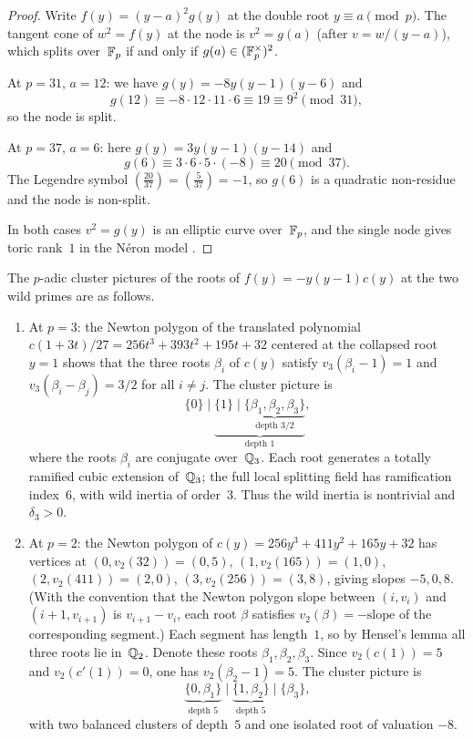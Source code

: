 \begin{proof}
Write \(f(y)=(y-a)^2g(y)\) at the double root \(y\equiv a\pmod{p}\). The tangent cone of \(w^2=f(y)\) at the node is \(v^2=g(a)\) (after \(v=w/(y-a)\)), which splits over~\(\mathbb{F}_p\) if and only if \(g(a)\in(\mathbb{F}_p^\times)^2\).

At \(p=31\), \(a=12\): we have \(g(y)=-8y(y-1)(y-6)\) and
\[
g(12)\equiv -8\cdot 12\cdot 11\cdot 6\equiv 19\equiv 9^2\pmod{31},
\]
so the node is split.

At \(p=37\), \(a=6\): here \(g(y)=3y(y-1)(y-14)\) and
\[
g(6)\equiv 3\cdot 6\cdot 5\cdot(-8)\equiv 20\pmod{37}.
\]
The Legendre symbol \(\left(\frac{20}{37}\right)=\left(\frac{5}{37}\right)=-1\), so \(g(6)\) is a quadratic non-residue and the node is non-split.

In both cases \(v^2=g(y)\) is an elliptic curve over~\(\mathbb{F}_p\), and the single node gives toric rank~\(1\) in the N\'eron model \cite{Liu2002}.
\end{proof}

\begin{proposition}\label{prop:cluster-pictures}
The \(p\)-adic cluster pictures of the roots of \(f(y)=-y(y-1)c(y)\) at the two wild primes are as follows.
\begin{enumerate}
\item[(i)] At \(p=3\): the Newton polygon of the translated polynomial \(c(1+3t)/27=256t^3+393t^2+195t+32\) centered at the collapsed root \(y=1\) shows that the three roots \(\beta_i\) of \(c(y)\) satisfy \(v_3(\beta_i-1)=1\) and \(v_3(\beta_i-\beta_j)=3/2\) for all \(i\neq j\). The cluster picture is
\[
\{0\}\;\bigg|\;\underbrace{\{1\}\;\bigg|\;\underbrace{\{\beta_1,\beta_2,\beta_3\}}_{\text{depth }3/2}}_{\text{depth }1},
\]
where the roots \(\beta_i\) are conjugate over~\(\mathbb{Q}_3\). Each root generates a totally ramified cubic extension of~\(\mathbb{Q}_3\); the full local splitting field has ramification index~\(6\), with wild inertia of order~\(3\). Thus the wild inertia is nontrivial and \(\delta_3>0\).
\item[(ii)] At \(p=2\): the Newton polygon of \(c(y)=256y^3+411y^2+165y+32\) has vertices at \((0,v_2(32))\!=\!(0,5)\), \((1,v_2(165))\!=\!(1,0)\), \((2,v_2(411))\!=\!(2,0)\), \((3,v_2(256))\!=\!(3,8)\), giving slopes \(-5,0,8\). (With the convention that the Newton polygon slope between \((i,v_i)\) and \((i+1,v_{i+1})\) is \(v_{i+1}-v_i\), each root \(\beta\) satisfies \(v_2(\beta)=-\text{slope}\) of the corresponding segment.) Each segment has length~\(1\), so by Hensel's lemma all three roots lie in~\(\mathbb{Q}_2\). Denote these roots \(\beta_1,\beta_2,\beta_3\). Since \(v_2(c(1))=5\) and \(v_2(c'(1))=0\), one has \(v_2(\beta_2-1)=5\). The cluster picture is
\[
\underbrace{\{0,\beta_1\}}_{\text{depth }5}\;\bigg|\;\underbrace{\{1,\beta_2\}}_{\text{depth }5}\;\bigg|\;\{\beta_3\},
\]
with two balanced clusters of depth~\(5\) and one isolated root of valuation \(-8\).
\end{enumerate}
\end{proposition}


